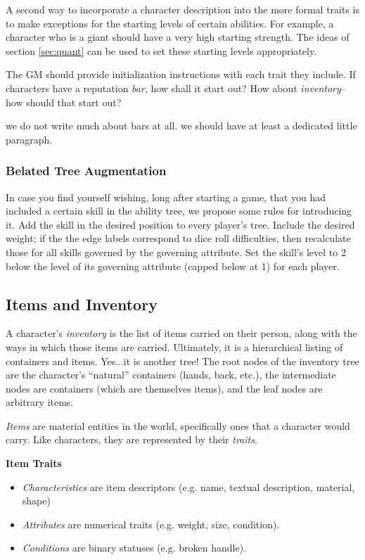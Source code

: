 \documentclass[12pt]{article}
\newcommand{\notes}[1]{{\color{Tan} #1}}
\begin{document}
A second way to incorporate a character description into the more formal traits
is to make exceptions for the starting levels of certain abilities.
For example, a character who is a giant should have a very high starting strength.
The ideas of section \ref{sec:quant} can be used to set these starting levels appropriately.

The GM should provide initialization instructions with each trait they include.
If characters have a reputation \emph{bar}, how shall it start out?
How about \emph{inventory}--how should that start out?

\notes{we do not write much about bars at all. we should have at least a dedicated little paragraph.}

\subsubsection{Belated Tree Augmentation}\label{sec:bta}

In case you find yourself wishing, long after starting a game,
that you had included a certain skill in the ability tree,
we propose some rules for introducing it.
Add the skill in the desired position to every player's tree.
Include the desired weight;
if the the edge labels correspond to dice roll difficulties, then recalculate those for all skills governed by the governing attribute.
Set the skill's level to 2 below the level of its governing attribute (capped below at 1) for each player.




\subsection{Items and Inventory} \label{sec:items}
A character's \emph{inventory} is the list of items carried on their person,
along with the ways in which those items are carried.
Ultimately, it is a hierarchical listing of containers and items.
Yes...it is another tree!
The root nodes of the inventory tree are the character's ``natural'' containers (hands, back, etc.),
the intermediate nodes are containers (which are themselves items),
and the leaf nodes are arbitrary items.

\emph{Items} are material entities in the world, 
specifically ones that a character would carry.
Like characters, they are represented by their \emph{traits}.

\textbf{Item Traits}
\vspace{-1em}
\begin{itemize}
\item \emph{Characteristics} are item descriptors (e.g. name, textual description, material, shape)
\item \emph{Attributes} are numerical traits (e.g. weight, size, condition).
\item \emph{Conditions} are binary statuses (e.g. broken handle).
\end{itemize}
\end{document}
